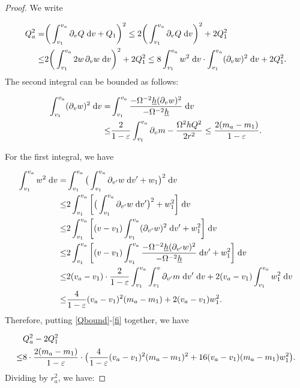 \documentclass{article}[11pt]
\newcommand{\hsp}{\hspace{.5mm}}
\newcommand{\hb}{\underline{h}}
\newcommand{\inta}{\int_{v_1}^{v_a}}
\newcommand{\dv}{\hspace{1mm}\text{d}v}
\newcommand{\dvprime}{\hspace{1mm} \text{d}v^{\prime}}
\numberwithin{equation}{section}
\begin{document}
\begin{proof}
We write

\begin{align} \notag
Q_a^2 =&\bigg(\int_{v_1}^{v_a}\partial_{v}Q \hspace{1mm} \text{d}v +Q_1\bigg)^2 \leq 2 \bigg(\inta \partial_v Q \hspace{1mm} \text{d}v\bigg)^2 +2Q_1^2 \\ \leq& 2\bigg(\inta 2 w \hsp \partial_v w \dv \bigg)^2 + 2Q_1^2  \leq 8  \inta w^2 \dv \cdot \inta (\partial_v w)^2 \dv + 2 Q_1^2.   \label{Qbound}
\end{align}The second integral can be bounded as follows:

\begin{align}
\inta (\partial_v w)^2 \dv =& \inta \frac{-\Omega^{-2}\hb (\partial_v w)^2}{-\Omega^{-2}\hb} \dv \notag \\ \leq& \frac{2}{1-\varepsilon}\inta \partial_v m - \frac{\Omega^2 h Q^2}{2r^2} \leq \frac{2(m_a-m_1)}{1-\varepsilon}.  \label{di}
\end{align}

For the first integral, we have

\begin{align}
\inta w^2 \dv = &\inta\big(\inta \partial_{v^{\prime}}w\hspace{1mm} \text{d}v^{\prime} +w_1\big)^2 \dv \notag \\ \leq& 2 \inta \bigg[ \big(\inta \partial_{v^{\prime}}w \dvprime\big)^2 +w_1^2 \bigg] \dv \notag \\ \leq& 2 \inta \bigg[ (v-v_1) \inta (\partial_{v^{\prime}}w)^2 \dvprime +w_1^2 \bigg] \dv \notag\\ \leq& 2 \inta \bigg[ (v-v_1) \inta \frac{-\Omega^{-2}\hb (\partial_{v^{\prime}}w)^2}{-\Omega^{-2}\hb} \dvprime +w_1^2 \bigg] \dv \notag\\ \leq& 2(v_a-v_1) \cdot \frac{2}{1-\varepsilon}\inta \int_{v_1}^v \partial_{v^{\prime}}m \hspace{1mm} \text{d}v^{\prime}\dv +2(v_a-v_1) \inta w_1^2 \dv \notag \\ \leq& \frac{4}{1-\varepsilon}(v_a-v_1)^2 (m_a-m_1) +2(v_a-v_1) w_1^2. \label{fi}
\end{align}
Therefore, putting \eqref{Qbound}-\eqref{fi} together, we have 

\begin{align}
&Q_a^2- 2Q_1^2 \notag \\ \leq& 8\cdot \frac{2(m_a-m_1)}{1-\varepsilon}\cdot \big( \frac{4}{1-\varepsilon}(v_a-v_1)^2(m_a-m_1)^2 + 16 (v_a-v_1)(m_a-m_1)w_1^2\big).
\end{align}
Dividing by $r_a^2$, we have:


\end{proof}
\end{document}
